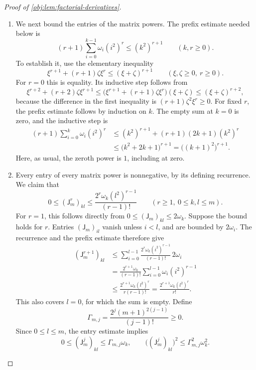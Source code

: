 \documentclass[11pt]{article}
\begin{document}
\begin{proof}[Proof of \cref{obj:lem:factorial-derivatives}]
\begin{enumerate}
\item We next bound the entries of the matrix powers. The prefix estimate needed below is
\[
(r+1)\sum_{i=0}^{k-1}\omega_i(i^2)^r
\le
(k^2)^{r+1}
\qquad(k,r\ge0).
\]
To establish it, use the elementary inequality
\[
\xi^{r+1}+(r+1)\zeta\xi^r
\le
(\xi+\zeta)^{r+1}
\qquad(\xi,\zeta\ge0,\ r\ge0).
\]
For \(r=0\) this is equality. Its inductive step follows from
\[
\xi^{r+2}+(r+2)\zeta\xi^{r+1}
\le
\bigl(\xi^{r+1}+(r+1)\zeta\xi^r\bigr)(\xi+\zeta)
\le
(\xi+\zeta)^{r+2},
\]
because the difference in the first inequality is
\((r+1)\zeta^2\xi^r\ge0\).
For fixed \(r\), the prefix estimate follows by induction on \(k\). The empty sum at \(k=0\) is zero, and the inductive step is
\[
\begin{aligned}
(r+1)\sum_{i=0}^{k}\omega_i(i^2)^r
&\le
(k^2)^{r+1}+(r+1)(2k+1)(k^2)^r\\
&\le
\bigl(k^2+2k+1\bigr)^{r+1}
=
\bigl((k+1)^2\bigr)^{r+1}.
\end{aligned}
\]
Here, as usual, the zeroth power is \(1\), including at zero.

\item Every entry of every matrix power is nonnegative, by its defining recurrence. We claim that
\[
0\le(\mathsf J_m^r)_{kl}
\le
\frac{2^r\omega_k(l^2)^{r-1}}{(r-1)!}
\qquad(r\ge1,\ 0\le k,l\le m).
\]
For \(r=1\), this follows directly from
\(0\le(\mathsf J_m)_{kl}\le2\omega_k\).
Suppose the bound holds for \(r\). Entries \((\mathsf J_m)_{il}\) vanish unless \(i<l\), and are bounded by \(2\omega_i\). The recurrence and the prefix estimate therefore give
\[
\begin{aligned}
(\mathsf J_m^{r+1})_{kl}
&\le
\sum_{i=0}^{l-1}
\frac{2^r\omega_k(i^2)^{r-1}}{(r-1)!}\,2\omega_i\\
&=
\frac{2^{r+1}\omega_k}{(r-1)!}
\sum_{i=0}^{l-1}\omega_i(i^2)^{r-1}\\
&\le
\frac{2^{r+1}\omega_k(l^2)^r}{r(r-1)!}
=
\frac{2^{r+1}\omega_k(l^2)^r}{r!}.
\end{aligned}
\]
This also covers \(l=0\), for which the sum is empty. Define
\[
\Gamma_{m,j}
=
\frac{2^j(m+1)^{2(j-1)}}{(j-1)!}\ge0.
\]
Since \(0\le l\le m\), the entry estimate implies
\[
0\le(\mathsf J_m^j)_{kl}\le\Gamma_{m,j}\omega_k,
\qquad
\bigl((\mathsf J_m^j)_{kl}\bigr)^2
\le
\Gamma_{m,j}^2\omega_k^2.
\]


\end{enumerate}
\end{proof}
\end{document}
